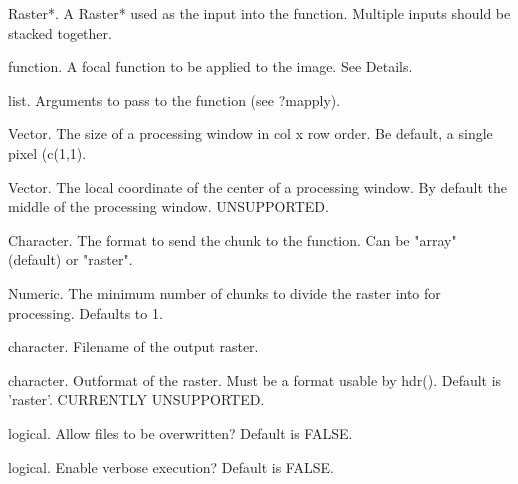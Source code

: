\documentclass[a4paper]{book}
\begin{document}
\begin{Arguments}
\begin{ldescription}
\item[\code{x}] Raster*. A Raster* used as the input into the
function.  Multiple inputs should be stacked together.

\item[\code{fun}] function. A focal function to be applied to
the image. See Details.

\item[\code{args}] list. Arguments to pass to the function (see
?mapply).

\item[\code{window\_dims}] Vector. The size of a processing
window in col x row order.  Be default, a single pixel
(c(1,1).

\item[\code{window\_center}] Vector. The local coordinate of the
center of a processing window.  By default the middle of
the processing window.  UNSUPPORTED.

\item[\code{chunk\_format}] Character. The format to send the
chunk to the function.  Can be "array" (default) or
"raster".

\item[\code{minblocks}] Numeric. The minimum number of chunks to
divide the raster into for processing.  Defaults to 1.

\item[\code{filename}] character. Filename of the output
raster.

\item[\code{outformat}] character. Outformat of the raster. Must
be a format usable by hdr(). Default is 'raster'.
CURRENTLY UNSUPPORTED.

\item[\code{overwrite}] logical. Allow files to be overwritten?
Default is FALSE.

\item[\code{verbose}] logical. Enable verbose execution? Default
is FALSE.
\end{ldescription}
\end{Arguments}
%
\end{document}
